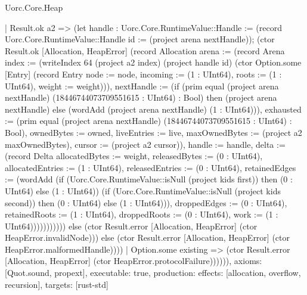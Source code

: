 \begin{lexlean}{Uorc.Core.Heap}
\begin{semanticmodule}
{              | Result.ok a2 => (let handle : Uorc.Core.RuntimeValue::Handle := (record Uorc.Core.RuntimeValue::Handle {id := (project arena nextHandle)}); (ctor Result.ok [Allocation, HeapError] (record Allocation {arena := (record Arena {index := (writeIndex 64 (project a2 index) (project handle id) (ctor Option.some [Entry] (record Entry {node := node, incoming := (1 : UInt64), roots := (1 : UInt64), weight := weight}))), nextHandle := (if (prim equal (project arena nextHandle) (18446744073709551615 : UInt64) : Bool) then (project arena nextHandle) else (wordAdd (project arena nextHandle) (1 : UInt64))), exhausted := (prim equal (project arena nextHandle) (18446744073709551615 : UInt64) : Bool), ownedBytes := owned, liveEntries := live, maxOwnedBytes := (project a2 maxOwnedBytes), cursor := (project a2 cursor)}), handle := handle, delta := (record Delta {allocatedBytes := weight, releasedBytes := (0 : UInt64), allocatedEntries := (1 : UInt64), releasedEntries := (0 : UInt64), retainedEdges := (wordAdd (if (Uorc.Core.RuntimeValue::isNull (project kids first)) then (0 : UInt64) else (1 : UInt64)) (if (Uorc.Core.RuntimeValue::isNull (project kids second)) then (0 : UInt64) else (1 : UInt64))), droppedEdges := (0 : UInt64), retainedRoots := (1 : UInt64), droppedRoots := (0 : UInt64), work := (1 : UInt64)})}))))))))) else (ctor Result.error [Allocation, HeapError] (ctor HeapError.invalidNode))) else (ctor Result.error [Allocation, HeapError] (ctor HeapError.malformedHandle))))
    | Option.some existing => (ctor Result.error [Allocation, HeapError] (ctor HeapError.protocolFailure)))))),
  axioms: [Quot.sound, propext],
  executable: true,
  production: {effects: [allocation, overflow, recursion], targets: [rust-std]}
}


\end{semanticmodule}
\end{lexlean}
